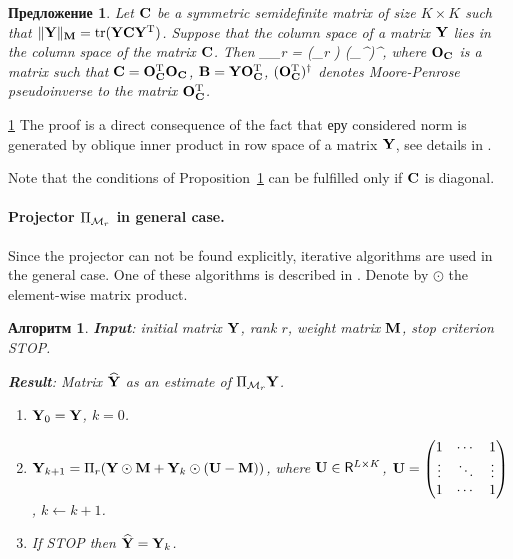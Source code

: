 \documentclass[12pt,a4paper,fleqn,leqno]{article}
\DeclareMathOperator{\tr}{tr}
\newtheorem{proposition}{Предложение}
\newtheorem{algorithm}{Алгоритм}
\begin{document}
\begin{proposition}
\label{prop:projS}
Let $\mathbf{C}$ be a symmetric semidefinite matrix of size $K \times K$ such that $\|\bfY\|_\bfM = \tr(\bfY \bfC \bfY^\rmT)$.
Suppose that the column space of a matrix $\mathbf{Y}$ lies in the column space of the matrix $\mathbf{C}$.
Then
\be
\label{eq:PiMr}
\Pi_{\calM_r} \bfY = (\Pi_r \bfB) (\bfO_\bfC^{\rmT})^\dagger,
\ee
where $\mathbf{O}_{\mathbf{C}}$ is a matrix such that $\mathbf{C} = \mathbf{O}_{\mathbf{C}}^{\mathrm{T}}\mathbf{O}_{\mathbf{C}}$,
$\mathbf{B} = \mathbf{Y} \mathbf{O}_{\mathbf{C}}^{\mathrm{T}}$, $(\mathbf{O}_{\mathbf{C}}^{\mathrm{T}})^\dagger$ denotes  Moore-Penrose pseudoinverse to the matrix $\mathbf{O}_{\mathbf{C}}^{\mathrm{T}}$.
\end{proposition}
\begin{proof5}{\ref{prop:projS}}
The proof is a direct consequence of the fact that еру considered norm is generated by oblique inner product in row space of a matrix $\mathbf{Y}$, see details in \cite{Golyandina2013}.
\end{proof5}

\begin{remark}
Note that the conditions of Proposition~\ref{prop:projS} can be fulfilled only if $\mathbf{C}$ is diagonal.
\end{remark}

\paragraph{Projector $\Pi_{\mathcal{M}_r}$ in general case.}
Since the projector can not be found explicitly, iterative algorithms are used in the general case.
One of these algorithms is described in \cite{Srebro2003}. Denote by $\odot$ the element-wise matrix product.

\begin{algorithm}
\label{alg:weightedSVD}
\textbf{Input}: initial matrix $\mathbf{Y}$, rank $r$, weight matrix $\mathbf{M}$,
stop criterion STOP.

\textbf{Result}:
Matrix $\widehat{\mathbf{Y}}$ as an estimate of $\Pi_{\mathcal{M}_r} \mathbf{Y}$.

\begin{enumerate}
\item
$\mathbf{Y}_0 = \mathbf{Y}$, $k=0$.
\item
$\mathbf{Y}_{k+1} = \Pi_r(\mathbf{Y} \odot \mathbf{M} + \mathbf{Y}_{k} \odot (\mathbf{U} -  \mathbf{M}))$, where
$\mathbf{U} \in \mathsf{R}^{L \times K}$,  $\mathbf{U} = \begin{pmatrix}
1 & \cdots & 1 \\
\vdots & \ddots & \vdots \\
1 & \cdots & 1
\end{pmatrix}$, $k\leftarrow k+1$.
\item
If STOP then $\widehat{\mathbf{Y}} = \mathbf{Y}_k$.
\end{enumerate}
\end{algorithm}
\end{document}
